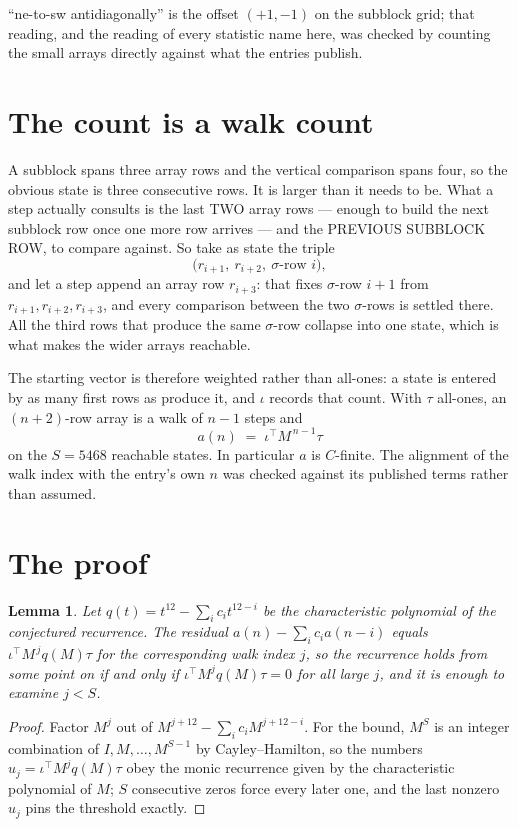\documentclass[11pt,a4paper]{article}
\theoremstyle{plain}
\newtheorem{lemma}[theorem]{Lemma}
\theoremstyle{definition}
\begin{document}
``ne-to-sw antidiagonally'' is the offset $(+1,-1)$ on the subblock grid; that reading, and
the reading of every statistic name here, was checked by counting the small arrays directly
against what the entries publish.

\section{The count is a walk count}

A subblock spans three array rows and the vertical comparison spans four, so the obvious state
is three consecutive rows. It is larger than it needs to be. What a step actually consults is
the last TWO array rows --- enough to build the next subblock row once one more row arrives ---
and the PREVIOUS SUBBLOCK ROW, to compare against. So take as state the triple
\[
\bigl(r_{i+1},\ r_{i+2},\ \sigma\text{-row }i\bigr),
\]
and let a step append an array row $r_{i+3}$: that fixes $\sigma$-row $i+1$ from
$r_{i+1},r_{i+2},r_{i+3}$, and every comparison between the two $\sigma$-rows is settled
there. All the third rows that produce the same $\sigma$-row collapse into one state, which is
what makes the wider arrays reachable.

The starting vector is therefore weighted rather than all-ones: a state is entered by as many
first rows as produce it, and $\iota$ records that count. With $\tau$ all-ones, an
$(n+2)$-row array is a walk of $n-1$ steps and
\[
a(n)\;=\;\iota^{\!\top}M^{\,n-1}\tau
\]
on the $S=5468$ reachable states. In particular $a$ is $C$-finite. The alignment of the walk
index with the entry's own $n$ was checked against its published terms rather than assumed.

\section{The proof}

\begin{lemma}\label{lem:crit}
Let $q(t)=t^{12}-\sum_i c_it^{12-i}$ be the characteristic polynomial of the
conjectured recurrence. The residual $a(n)-\sum_ic_ia(n-i)$ equals
$\iota^{\!\top}M^{\,j}q(M)\tau$ for the corresponding walk index $j$, so the recurrence
holds from some point on if and only if $\iota^{\!\top}M^{j}q(M)\tau=0$ for all large $j$,
and it is enough to examine $j<S$.
\end{lemma}

\begin{proof}
Factor $M^{j}$ out of $M^{j+12}-\sum_ic_iM^{j+12-i}$. For the bound, $M^{S}$
is an integer combination of $I,M,\dots,M^{S-1}$ by Cayley--Hamilton, so the numbers
$u_j=\iota^{\!\top}M^{j}q(M)\tau$ obey the monic recurrence given by the characteristic
polynomial of $M$; $S$ consecutive zeros force every later one, and the last nonzero $u_j$
pins the threshold exactly.
\end{proof}
\end{document}
